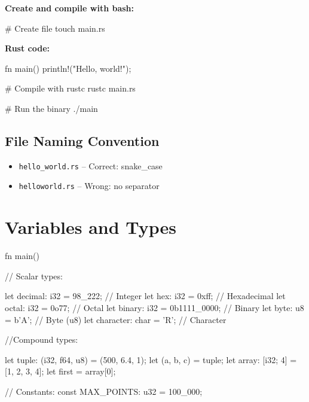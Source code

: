 \documentclass[8pt,a4paper,twocolumn]{extarticle}
\begin{document}
\textbf{Create and compile with bash:}
\begin{Code}
# Create file
touch main.rs
\end{Code}
\textbf{Rust code:}
\begin{Code}
fn main() {
    println!("Hello, world!");
}
\end{Code}
\begin{Code}
# Compile with rustc
rustc main.rs

# Run the binary
./main
\end{Code}



\subsection{File Naming Convention}
\begin{itemize}
  \item \textcolor{green}{} \texttt{hello\_world.rs} -- Correct: snake\_case
  \item \textcolor{red}{} \texttt{helloworld.rs} -- Wrong: no separator
\end{itemize}

\section{Variables and Types}

\begin{Code}
fn main() {

    // Scalar types: 

    let decimal: i32 = 98_222;      // Integer
    let hex: i32 = 0xff;            // Hexadecimal
    let octal: i32 = 0o77;          // Octal
    let binary: i32 = 0b1111_0000;  // Binary
    let byte: u8 = b'A';            // Byte (u8)
    let character: char = 'R';      // Character

    //Compound types:

    let tuple: (i32, f64, u8) = (500, 6.4, 1);
    let (a, b, c) = tuple;
    let array: [i32; 4] = [1, 2, 3, 4];
    let first = array[0];

    // Constants:
    const MAX_POINTS: u32 = 100_000;

}
\end{Code}
\end{document}
